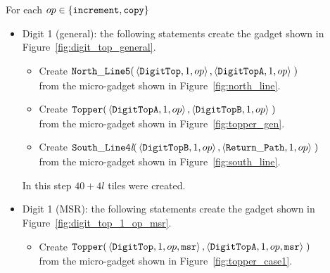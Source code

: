 For each $op \in \{ {\tt increment, copy } \}$
    \begin{itemize}

        \item Digit 1 (general): the following statements create the gadget shown in Figure~\ref{fig:digit_top_general}.
        \begin{itemize}
            \item Create
            $\begin{aligned}[t]
                {\tt North\_Line5}(& \left \langle {\tt DigitTop},  1, op \right\rangle,
                                     \left \langle {\tt DigitTopA}, 1, op \right\rangle \;)
            \end{aligned}$\\from the micro-gadget shown in Figure~\ref{fig:north_line}.

            \item Create
            $\begin{aligned}[t]
                {\tt Topper}(& \left \langle {\tt DigitTopA}, 1, op \right\rangle,
                               \left \langle {\tt DigitTopB}, 1, op \right\rangle \;)
            \end{aligned}$\\from the micro-gadget shown in Figure~\ref{fig:topper_gen}.

            \item Create
            $\begin{aligned}[t]
                {\tt South\_Line4\textit{l}}(& \left\langle {\tt DigitTopB}, 1, op \right\rangle,
                                               \left\langle {\tt Return\_Path},     1, op \right\rangle \;)
            \end{aligned}$\\from the micro-gadget shown in Figure~\ref{fig:south_line}.
        \end{itemize}
        In this step $40 + 4l$ tiles were created.
        \vspace{1cm}

        \item Digit 1 (MSR): the following statements create the gadget shown in Figure~\ref{fig:digit_top_1_op_msr}.
        \begin{itemize}
            \item Create
            $\begin{aligned}[t]
                {\tt Topper}(& \left\langle {\tt DigitTop},  1, op, {\tt msr} \right\rangle,
                               \left\langle {\tt DigitTopA}, 1, op, {\tt msr} \right\rangle \;)
            \end{aligned}$ \\ from the micro-gadget shown in Figure~\ref{fig:topper_case1}.



\end{itemize}
\end{itemize}
